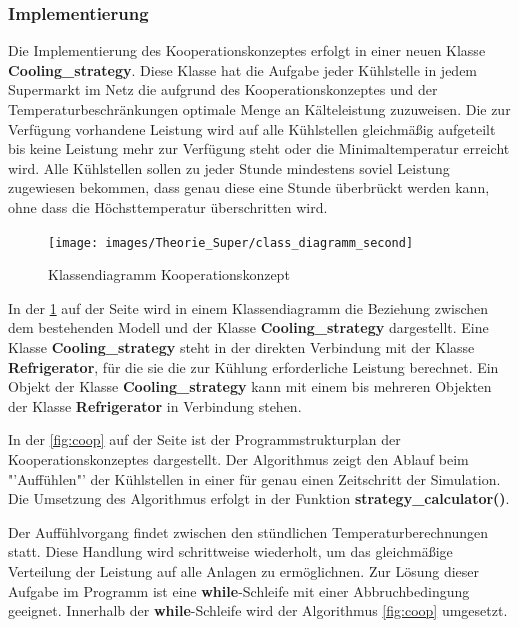 \subsubsection*{Implementierung}
Die Implementierung des Kooperationskonzeptes erfolgt in einer neuen Klasse
\textbf{Cooling\_strategy}. Diese Klasse hat die Aufgabe jeder K\"uhlstelle in
jedem Supermarkt im Netz die aufgrund des Kooperationskonzeptes und der
Temperaturbeschr\"ankungen optimale Menge an K\"alteleistung zuzuweisen. Die zur
Verf\"ugung vorhandene Leistung wird auf alle K\"uhlstellen gleichm\"a\ss ig
aufgeteilt bis keine Leistung mehr zur Verf\"ugung steht oder die
Minimaltemperatur erreicht wird. Alle K\"uhlstellen sollen zu jeder Stunde
mindestens soviel Leistung zugewiesen bekommen, dass genau diese eine Stunde
\"uberbr\"uckt werden kann, ohne dass die H\"ochsttemperatur \"uberschritten
wird.
\begin{figure}[h!]
	\begin{center}
	\texttt{[image: images/Theorie\_Super/class\_diagramm\_second]}
	\end{center}
\caption{Klassendiagramm Kooperationskonzept}
\label{fig:klasskoop}
\end{figure}

In der \cref{fig:klasskoop} auf der Seite \pageref{fig:klasskoop} wird in einem
Klassendiagramm die Beziehung zwischen dem bestehenden Modell und der Klasse
\textbf{Cooling\_strategy} dargestellt. Eine Klasse \textbf{Cooling\_strategy}
steht in der direkten Verbindung mit der Klasse \textbf{Refrigerator}, f\"ur die
sie die zur K\"uhlung erforderliche Leistung berechnet. Ein Objekt der Klasse
\textbf{Cooling\_strategy} kann mit einem bis mehreren Objekten der Klasse
\textbf{Refrigerator} in Verbindung stehen.

In der \cref{fig:coop} auf der Seite \pageref{fig:coop} ist der
Programmstrukturplan der Kooperationskonzeptes dargestellt. Der Algorithmus
zeigt den Ablauf beim "'Auff\"uhlen"' der K\"uhlstellen in einer f\"ur genau
einen Zeitschritt der Simulation. Die Umsetzung des Algorithmus erfolgt in der
Funktion \textbf{strategy\_calculator()}.

Der Auff\"uhlvorgang findet zwischen den st\"undlichen Temperaturberechnungen
statt. Diese Handlung wird schrittweise wiederholt, um das gleichm\"a\ss ige
Verteilung der Leistung auf alle Anlagen zu erm\"oglichnen. Zur L\"osung dieser
Aufgabe im Programm ist eine \textbf{while}-Schleife mit einer Abbruchbedingung
geeignet. Innerhalb der \textbf{while}-Schleife wird der Algorithmus
\cref{fig:coop} umgesetzt.


